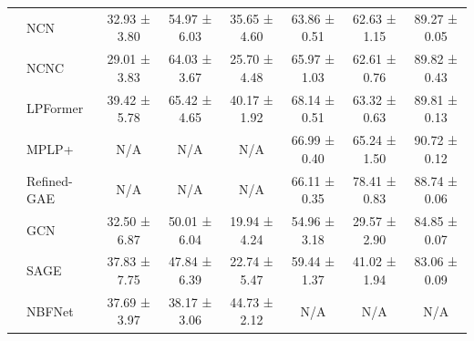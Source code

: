 \documentclass{article}
\newcommand{\catdot}[1]{%
  \tikz[baseline={(mark.base)}]{\node[circle, draw=black, line width=0.25pt, fill=#1, inner sep=2pt] (mark) {};}%
}
\theoremstyle{plain}
\theoremstyle{definition}
\theoremstyle{remark}
\begin{document}
\begin{table}[t]
{\begin{tabular}{@{}clcccccc@{}}
             & NCN                        & 32.93 ± 3.80                        & 54.97 ± 6.03                        & 35.65 ± 4.60                        & 63.86 ± 0.51                        & 62.63 ± 1.15                        & 89.27 ± 0.05                        \\
             & NCNC                       & 29.01 ± 3.83                        & {\color{secondbest} 64.03 ± 3.67}   & 25.70 ± 4.48                        & 65.97 ± 1.03                        & 62.61 ± 0.76                        & {\color{secondbest} 89.82 ± 0.43}   \\
             & LPFormer                   & {\color{secondbest} 39.42 ± 5.78}   & {\color{firstbest} 65.42 ± 4.65}    & {\color{secondbest} 40.17 ± 1.92}   & {\color{firstbest} 68.14 ± 0.51}    & 63.32 ± 0.63                        & {\color{thirdbest} 89.81 ± 0.13}    \\ \midrule
    \multirow{2}{*}{\raisebox{0.75ex}{\catdot{catorange}}} 
             & MPLP+                      & N/A                                 & N/A                                 & N/A                                 & {\color{secondbest} 66.99 ± 0.40}   & 65.24 ± 1.50                        & {\color{firstbest} 90.72 ± 0.12}    \\
             & Refined-GAE                & N/A                                 & N/A                                 & N/A                                 & 66.11 ± 0.35                        & {\color{secondbest} 78.41 ± 0.83}   & 88.74 ± 0.06                        \\ \midrule
    \multirow{5}{*}{\raisebox{0.75ex}{\catdot{catred}}}
             & GCN                        & 32.50 ± 6.87                        & 50.01 ± 6.04                        & 19.94 ± 4.24                        & 54.96 ± 3.18                        & 29.57 ± 2.90                        & 84.85 ± 0.07                        \\
             & SAGE                       & {\color{thirdbest} 37.83 ± 7.75}    & 47.84 ± 6.39                        & 22.74 ± 5.47                        & 59.44 ± 1.37                        & 41.02 ± 1.94                        & 83.06 ± 0.09                        \\
             & NBFNet                     & 37.69 ± 3.97                        & 38.17 ± 3.06                        & {\color{firstbest} 44.73 ± 2.12}    & N/A                                 & N/A                                 & N/A                                 \\

\end{tabular}}
\end{table}
\end{document}
